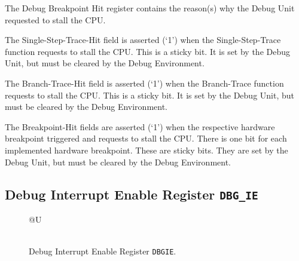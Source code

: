 \fi

The Debug Breakpoint Hit register contains the reason(s) why the Debug
Unit requested to stall the CPU.

The Single-Step-Trace-Hit field is asserted (`1') when the
Single-Step-Trace function requests to stall the CPU. This is a sticky
bit. It is set by the Debug Unit, but must be cleared by the Debug
Environment.

The Branch-Trace-Hit field is asserted (`1') when the Branch-Trace
function requests to stall the CPU. This is a sticky bit. It is set by
the Debug Unit, but must be cleared by the Debug Environment.

The Breakpoint-Hit fields are asserted (`1') when the respective
hardware breakpoint triggered and requests to stall the CPU. There is
one bit for each implemented hardware breakpoint. These are sticky bits.
They are set by the Debug Unit, but must be cleared by the Debug
Environment.

\subsection{Debug Interrupt Enable Register \texttt{DBG\_IE}} \label{debug-interrupt-enable-register-dbg_ie}

\ifdefined\MARKDOWN
\else

\begin{figure*}[h!]
	{\footnotesize
		\begin{center}
			\begin{tabular}{@{}U}
				 \\
				\hline
				  \\
				\hline
			\end{tabular}
		\end{center}
	}
	\vspace{-0.1in}
	\caption{Debug Interrupt Enable Register \texttt{DBGIE}.}
	\label{fig:dbgiereg}
\end{figure*}

\fi

